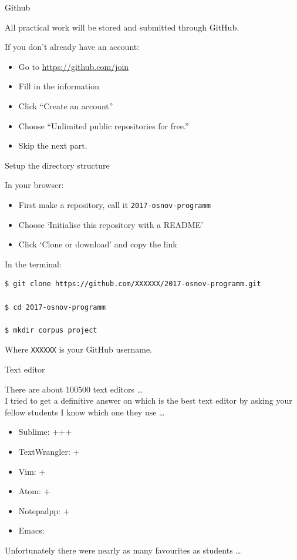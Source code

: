 \documentclass[10pt, compress]{beamer}
\begin{document}
\begin{frame}{Github}

All practical work will be stored and submitted through GitHub.

If you don't already have an account:
\begin{itemize}
 \item Go to \url{https://github.com/join}
 \item Fill in the information
 \item Click ``Create an account''
 \item Choose ``Unlimited public repositories for free.''
 \item Skip the next part.
\end{itemize}

\end{frame}

\begin{frame}[fragile]{Setup the directory structure}

In your browser:
\begin{itemize}
  \item First make a repository, call it {\tt 2017-osnov-programm}
  \item Choose `Initialise this repository with a README'
  \item Click `Clone or download' and copy the link
\end{itemize}

In the terminal:

\begin{verbatim}
$ git clone https://github.com/XXXXXX/2017-osnov-programm.git

$ cd 2017-osnov-programm

$ mkdir corpus project
\end{verbatim}

Where {\tt XXXXXX} is your GitHub username.



\end{frame}

\begin{frame}{Text editor}

There are about 100500 text editors \ldots
~\\

I tried to get a definitive answer on which is the best text editor by asking
your fellow students I know which one they use \ldots

\begin{itemize}
\item Sublime: +++
\item TextWrangler: +
\item Vim: +
\item Atom: +
\item Notepadpp: +
\item Emacs:
\end{itemize}

Unfortunately there were nearly as many favourites as students \ldots


\end{frame}
\end{document}
